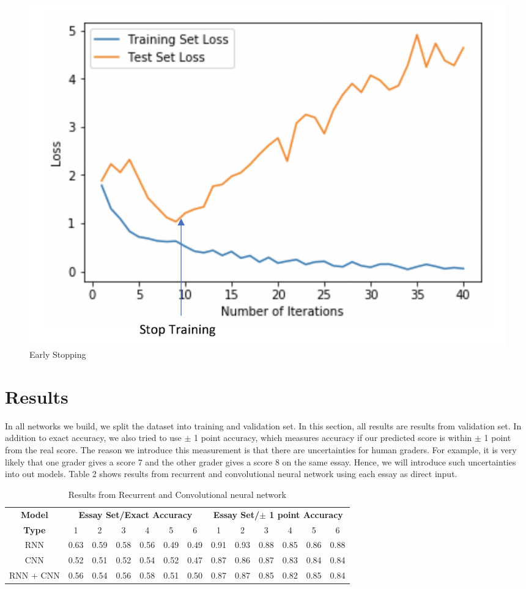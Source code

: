 \documentclass[11pt,conference]{IEEEtran}
\begin{document}
\begin{figure}[htbp]
\centerline{\includegraphics{fig2.png}}
\caption{Early Stopping}
\label{fig}
\end{figure}


\section{Results}

In all networks we build, we split the dataset into training and validation set. In this section, all results are results from validation set. In addition to exact accuracy, we also tried to use $\pm$ 1 point accuracy, which measures accuracy if our predicted score is within $\pm$ 1 point from the real score. The reason we introduce this measurement is that there are uncertainties for human graders. For example, it is very likely that one grader gives a score 7 and the other grader gives a score 8 on the same essay. Hence, we will introduce such uncertainties into out models. Table 2 shows results from recurrent and convolutional neural network using each essay as direct input. 

\begin{table}[htbp]
\caption{Results from Recurrent and Convolutional neural network}
\begin{center}
\begin{tabular}{|c|c|c|c|c|c|c|c|c|c|c|c|c|}
\hline

\textbf{Model} &\multicolumn{6}{|c|}{\textbf{Essay Set/Exact Accuracy}} &\multicolumn{6}{|c|}{\textbf{Essay Set/$\pm$ 1 point Accuracy}} \\
\cline{2-7} 
\cline{8-13} 
\textbf{Type}&1 &2&3&4&5&6&1 &2&3&4&5&6\\
\hline
RNN& 0.63&0.59&0.58&0.56&0.49&0.49&0.91&0.93&0.88&0.85&0.86&0.88\\
\hline
CNN&0.52&0.51&0.52&0.54&0.52&0.47&0.87&0.86&0.87&0.83&0.84&0.84\\ 
\hline
RNN + CNN&0.56&0.54&0.56&0.58&0.51&0.50&0.87&0.87&0.85&0.82&0.85&0.84\\
\hline
\end{tabular}
\label{tab1}
\end{center}
\end{table}
\end{document}
